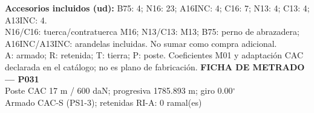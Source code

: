 \begingroup\scriptsize
\textbf{Accesorios incluidos (ud):} B75: 4; N16: 23; A16INC: 4; C16: 7; N13: 4; C13: 4; A13INC: 4.\\
N16/C16: tuerca/contratuerca M16; N13/C13: M13; B75: perno de abrazadera; A16INC/A13INC: arandelas incluidas. No sumar como compra adicional.\\
A: armado; R: retenida; T: tierra; P: poste. Coeficientes M01 y adaptación CAC declarada en el catálogo; no es plano de fabricación.
\endgroup\endgroup
\clearpage{}
\begingroup\small\setlength{\parskip}{3pt}\renewcommand{\arraystretch}{1.05}
\textbf{\large FICHA DE METRADO — P031}\\[4pt]
Poste CAC 17 m / 600 daN; progresiva 1785.893 m; giro 0.00\ensuremath{^\circ}\\
Armado CAC-S (PS1-3); retenidas RI-A: 0 ramal(es)\\
\begingroup\scriptsize
